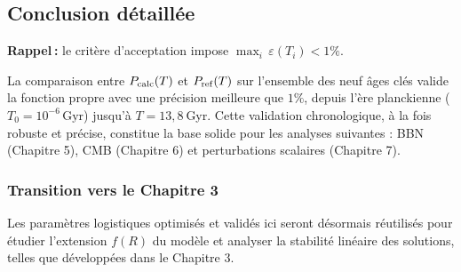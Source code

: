 \subsection{Conclusion détaillée}

\noindent\textbf{Rappel :} le critère d’acceptation impose 
\(\max_{i}\,\varepsilon(T_i)<1\%\).

La comparaison entre \(P_{\rm calc}(T)\) et \(P_{\rm ref}(T)\) sur l’ensemble des neuf âges clés valide la fonction propre avec une précision meilleure que \(1\%\), depuis l’ère planckienne (\(T_{0}=10^{-6}\,\mathrm{Gyr}\)) jusqu’à \(T=13{,}8\) Gyr.  
Cette validation chronologique, à la fois robuste et précise, constitue la base solide pour les analyses suivantes : BBN (Chapitre 5), CMB (Chapitre 6) et perturbations scalaires (Chapitre 7).

\subsubsection*{Transition vers le Chapitre 3}

Les paramètres logistiques optimisés et validés ici seront désormais réutilisés pour étudier l’extension \(f(R)\) du modèle et analyser la stabilité linéaire des solutions, telles que développées dans le Chapitre 3.  


